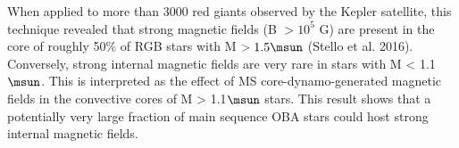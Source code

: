 When applied to more than 3000 red giants observed by the Kepler satellite, this technique revealed that
strong magnetic fields (B $\gt 10^5$ G) are present in the core of roughly 50\% of RGB stars with M $> 1.5\msun$ (Stello et al. 2016).
Conversely, strong internal magnetic fields are very rare in stars with M < 1.1$\msun$. This is interpreted as the
effect of MS core-dynamo-generated magnetic fields in the convective cores of M > 1.1$\msun$ stars.
This result shows that a potentially very large fraction of main sequence OBA stars could host strong internal magnetic fields.





